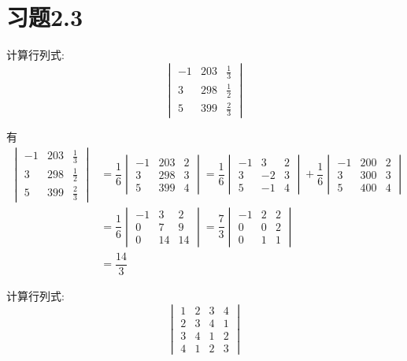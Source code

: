 \documentclass{ctexart}
\begin{document}
\section*{习题2.3}
\begin{homework}[1(2)]
    计算行列式:
    \[\begin{vmatrix}
        -1&203&\frac13\\
        3&298&\frac12\\
        5&399&\frac23
    \end{vmatrix}\]
\end{homework}
\begin{solution}
    有
    \[\begin{aligned}
        \begin{vmatrix}
        -1&203&\frac13\\
        3&298&\frac12\\
        5&399&\frac23
    \end{vmatrix}
    &= \dfrac16\begin{vmatrix}
            -1&203&2\\
            3&298&3\\
            5&399&4
        \end{vmatrix}=\dfrac16\begin{vmatrix}
            -1&3&2\\3&-2&3\\5&-1&4
        \end{vmatrix}+\dfrac16\begin{vmatrix}
            -1&200&2\\3&300&3\\5&400&4
        \end{vmatrix}\\
    &= \dfrac16\begin{vmatrix}
        -1&3&2\\0&7&9\\0&14&14
        \end{vmatrix}=\dfrac{7}{3}\begin{vmatrix}
            -1&2&2\\0&0&2\\0&1&1
        \end{vmatrix}\\
    &= \dfrac{14}{3}
    \end{aligned}\]
\end{solution}
\begin{homework}[1(4)]
    计算行列式:
    \[\begin{vmatrix}
        1&2&3&4\\
        2&3&4&1\\
        3&4&1&2\\
        4&1&2&3
    \end{vmatrix}\]
\end{homework}
\end{document}

